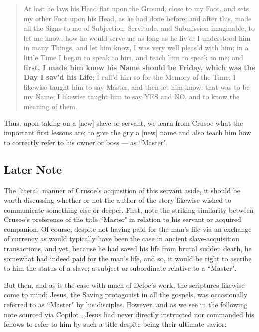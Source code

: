 \documentclass[a4paper]{article}
\begin{document}
\noindent
\begin{minipage}{1\textwidth}
\vspace{1em}
\begin{quotation}
{\ttfamily


At last he lays his Head flat upon the Ground, close to my Foot, and sets my other Foot upon his Head, as he had done before; and after this, made all the Signs to me of Subjection, Servitude, and Submission imaginable, to let me know, how he would serve me as long as he liv’d; I understood him in many Things, and let him know, I was very well pleas’d with him; in a little Time I began to speak to him, and teach him to speak to me; and \textbf{first, I made him know his Name should be Friday, which was the Day I sav’d his Life}; I call’d him so for the Memory of the Time; I likewise taught him to say Master, and then let him know, that was to be my Name; I likewise taught him to say YES and NO, and to know the meaning of them.


}
\end{quotation}
\vspace{1em}
\end{minipage}




Thus, upon taking on a [new] slave or servant, we learn from Crusoe what the important first lessons are; to give the guy a [new] name and also teach him how to correctly refer to his owner or boss --- as ``Master".


\subsection{Later Note}

The [literal] manner of Crusoe's acquisition of this servant aside, it should be worth discussing whether or not the author of the story likewise wished to communicate something else or deeper. First, note the striking similarity between Crusoe's preference of the title ``Master" in relation to his servant or acquired companion. Of course, despite not having paid for the man's life via an exchange of currency as would typically have been the case in ancient slave-acquisition transactions, and yet, because he had saved his life from brutal sudden death, he somewhat had indeed paid for the man's life, and so, it would be right to ascribe to him the status of a slave; a subject or subordinate relative to a ``Master". 

But then, and as is the case with much of Defoe's work, the scriptures likewise come to mind; Jesus, the Saving protagonist in all the gospels, was occasionally referred to as ``Master" by his disciples. However, and as we see in the following note sourced via Copilot \cite{copilot_assistant}, Jesus had never directly instructed nor commanded his fellows to refer to him by such a title despite being their ultimate savior:
\end{document}
